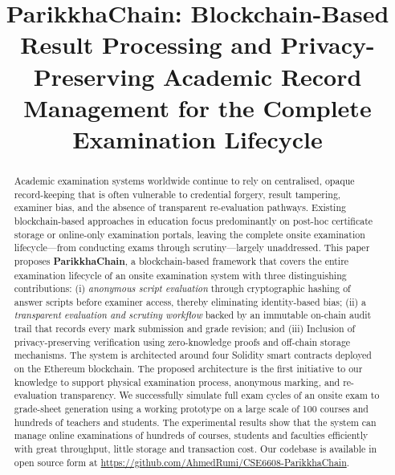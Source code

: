 \documentclass[conference]{IEEEtran}
\begin{document}
\title{ParikkhaChain: Blockchain-Based Result Processing and 
Privacy-Preserving Academic Record Management for the 
Complete Examination Lifecycle }

\author{
\and
{}
\and
{}}

\maketitle

\begin{abstract}
Academic examination systems worldwide continue to rely on centralised,
opaque record-keeping that is often vulnerable to credential forgery, result
tampering, examiner bias, and the absence of transparent re-evaluation
pathways.  Existing blockchain-based approaches in education focus
predominantly on post-hoc certificate storage or online-only examination
portals, leaving the complete onsite examination lifecycle---from conducting exams through scrutiny---largely unaddressed.  This paper proposes
\textbf{ParikkhaChain}, a blockchain-based framework that covers the entire
examination lifecycle of an onsite examination system with three distinguishing contributions: (i)
\emph{anonymous script evaluation} through cryptographic hashing of answer
scripts before examiner access, thereby eliminating identity-based bias; (ii)
a \emph{transparent evaluation and scrutiny workflow} backed by an immutable on-chain audit
trail that records every mark submission and grade revision; and (iii) Inclusion of privacy-preserving verification using zero-knowledge proofs and off-chain 
storage mechanisms.  The system is architected around four Solidity smart contracts
deployed on the Ethereum blockchain. The proposed architecture is the first initiative to our knowledge to support physical examination process, anonymous marking, and
re-evaluation transparency. We successfully simulate full exam cycles of an onsite exam to grade-sheet generation using a working prototype on a large scale of 100 courses and hundreds of teachers and students. The experimental results show that the system can manage online examinations of hundreds of courses, students and faculties efficiently with great throughput, little storage and transaction cost. Our codebase is available in open source form at \url{https://github.com/AhmedRumi/CSE6608-ParikkhaChain}.

\end{abstract}
\end{document}
